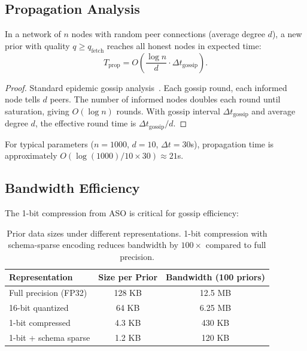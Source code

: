 \subsection{Propagation Analysis}

\begin{proposition}
\label{prop:propagation}
In a network of $n$ nodes with random peer connections (average degree $d$),
a new prior with quality $q \geq q_{\text{fetch}}$ reaches all honest nodes
in expected time:
\begin{equation}
    T_{\text{prop}} = O\left(\frac{\log n}{d} \cdot \Delta t_{\text{gossip}}\right).
\end{equation}
\end{proposition}

\begin{proof}
Standard epidemic gossip analysis~\cite{demers1987epidemic}. Each gossip round,
each informed node tells $d$ peers. The number of informed nodes doubles each
round until saturation, giving $O(\log n)$ rounds. With gossip interval
$\Delta t_{\text{gossip}}$ and average degree $d$, the effective round time is
$\Delta t_{\text{gossip}} / d$.
\end{proof}

For typical parameters ($n = 1000$, $d = 10$, $\Delta t = 30$s), propagation
time is approximately $O(\log(1000) / 10 \times 30) \approx 21$s.

\subsection{Bandwidth Efficiency}

The 1-bit compression from ASO is critical for gossip efficiency:

\begin{table}[h]
\centering
\begin{tabular}{lcc}
\toprule
Representation & Size per Prior & Bandwidth (100 priors) \\
\midrule
Full precision (FP32) & 128 KB & 12.5 MB \\
16-bit quantized & 64 KB & 6.25 MB \\
1-bit compressed & 4.3 KB & 430 KB \\
1-bit + schema sparse & 1.2 KB & 120 KB \\
\bottomrule
\end{tabular}
\caption{Prior data sizes under different representations. 1-bit compression
with schema-sparse encoding reduces bandwidth by $100\times$ compared to
full precision.}
\label{tab:bandwidth}
\end{table}

